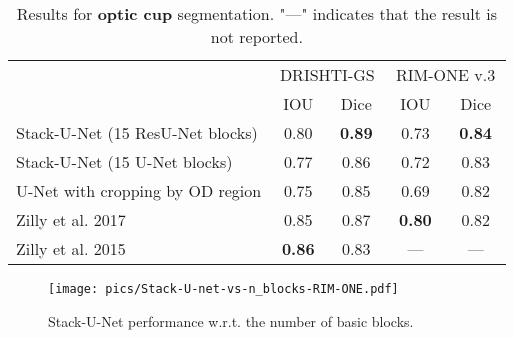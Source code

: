 \documentclass{llncs}
\begin{document}
\begin{table}[ht!]
        	\centering
        	\begin{tabular}{l|c|c|c|c}
        		\hline
        		& \multicolumn{2}{c|}{\,DRISHTI-GS\,} &
        		\multicolumn{2}{c}{\,RIM-ONE v.3\,} \\   %
        		& IOU & Dice & IOU & Dice \\ \hline \hline
        		Stack-U-Net (15 ResU-Net blocks) & 0.80 & \textbf{0.89} & 0.73 & \textbf{0.84} \\
                Stack-U-Net (15 U-Net blocks) & 0.77 & 0.86 & 0.72 & 0.83 \\  
                \hline
        		U-Net with cropping by OD region 
                \cite{sevastopolsky2017optic} & 0.75 & 0.85 & 0.69 & 0.82 \\
        		Zilly et al. 2017 \cite{zilly2017glaucoma} & 0.85 & 0.87 & \textbf{0.80} & 0.82 \\
        		Zilly et al. 2015 \cite{zilly2015boosting} & \textbf{0.86} & 0.83 & --- & --- \\ \hline
        	\end{tabular}
            \newline\newline
        	\caption{Results for \textbf{optic cup} segmentation. "---" indicates that the result is not reported.}
            \label{table:optic_cup_results}
\end{table}

      \begin{figure}[ht!]
        \centering
        \texttt{[image: pics/Stack-U-net-vs-n\_blocks-RIM-ONE.pdf]}
        \caption{Stack-U-Net performance w.r.t. the number of basic blocks.}
        \label{fig:stack-u-net_vs_n_blocks}
    \end{figure}
    
\end{document}

